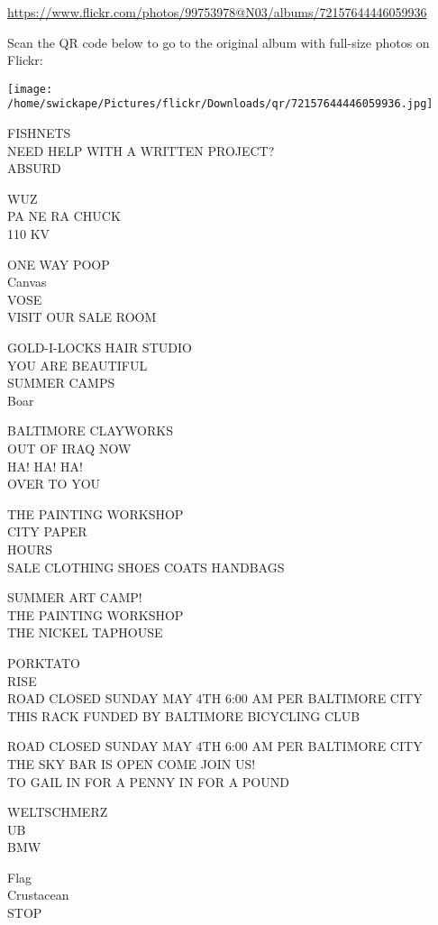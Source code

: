\documentclass[10pt,letterpaper]{article}
\begin{document}
\url{https://www.flickr.com/photos/99753978@N03/albums/72157644446059936}

Scan the QR code below to go to the original album with full-size photos on Flickr:

\texttt{[image: /home/swickape/Pictures/flickr/Downloads/qr/72157644446059936.jpg]}
\pagebreak

FISHNETS\\
NEED HELP WITH A WRITTEN PROJECT?\\
ABSURD

WUZ\\
PA NE RA CHUCK\\
110 KV

ONE WAY POOP\\
Canvas\\
VOSE\\
VISIT OUR SALE ROOM

GOLD{-}I{-}LOCKS HAIR STUDIO\\
YOU ARE BEAUTIFUL\\
SUMMER CAMPS\\
Boar

BALTIMORE CLAYWORKS\\
OUT OF IRAQ NOW\\
HA! HA! HA!\\
OVER TO YOU

THE PAINTING WORKSHOP\\
CITY PAPER\\
HOURS\\
SALE CLOTHING SHOES COATS HANDBAGS

SUMMER ART CAMP!\\
THE PAINTING WORKSHOP\\
THE NICKEL TAPHOUSE

PORKTATO\\
RISE\\
ROAD CLOSED SUNDAY MAY 4TH 6:00 AM PER BALTIMORE CITY\\
THIS RACK FUNDED BY BALTIMORE BICYCLING CLUB

ROAD CLOSED SUNDAY MAY 4TH 6:00 AM PER BALTIMORE CITY\\
THE SKY BAR IS OPEN COME JOIN US!\\
TO GAIL IN FOR A PENNY IN FOR A POUND

WELTSCHMERZ\\
UB\\
BMW

Flag\\
Crustacean\\
STOP
\end{document}
